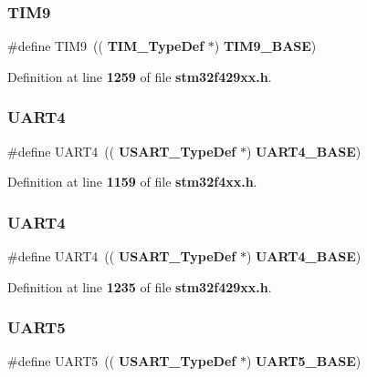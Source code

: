 \subsubsection{T\+I\+M9\hspace{0.1cm}{\footnotesize\ttfamily [2/2]}}
{\footnotesize\ttfamily \#define T\+I\+M9~((\textbf{ T\+I\+M\+\_\+\+Type\+Def} $\ast$) \textbf{ T\+I\+M9\+\_\+\+B\+A\+SE})}



Definition at line \textbf{ 1259} of file \textbf{ stm32f429xx.\+h}.

\mbox{\label{group__Peripheral__declaration_ga7c035f6f443c999fc043b2b7fb598800}} 
\subsubsection{U\+A\+R\+T4\hspace{0.1cm}{\footnotesize\ttfamily [1/2]}}
{\footnotesize\ttfamily \#define U\+A\+R\+T4~((\textbf{ U\+S\+A\+R\+T\+\_\+\+Type\+Def} $\ast$) \textbf{ U\+A\+R\+T4\+\_\+\+B\+A\+SE})}



Definition at line \textbf{ 1159} of file \textbf{ stm32f4xx.\+h}.

\mbox{\label{group__Peripheral__declaration_ga7c035f6f443c999fc043b2b7fb598800}} 
\subsubsection{U\+A\+R\+T4\hspace{0.1cm}{\footnotesize\ttfamily [2/2]}}
{\footnotesize\ttfamily \#define U\+A\+R\+T4~((\textbf{ U\+S\+A\+R\+T\+\_\+\+Type\+Def} $\ast$) \textbf{ U\+A\+R\+T4\+\_\+\+B\+A\+SE})}



Definition at line \textbf{ 1235} of file \textbf{ stm32f429xx.\+h}.

\mbox{\label{group__Peripheral__declaration_ga9274e37cf5e8a174fc5dd627b98ec0fe}} 
\subsubsection{U\+A\+R\+T5\hspace{0.1cm}{\footnotesize\ttfamily [1/2]}}
{\footnotesize\ttfamily \#define U\+A\+R\+T5~((\textbf{ U\+S\+A\+R\+T\+\_\+\+Type\+Def} $\ast$) \textbf{ U\+A\+R\+T5\+\_\+\+B\+A\+SE})}



